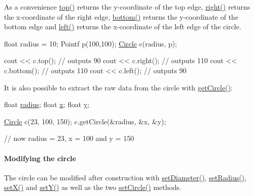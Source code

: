 As a convenience \hyperlink{classprism_1_1_circle_a2c1851a017d5379d8ddf2a80d7bd1b1b}{top()} returns the y-\/coordinate of the top edge, \hyperlink{classprism_1_1_circle_a3b8cdbb5ad090615534c09543afadf88}{right()} returns the x-\/coordinate of the right edge, \hyperlink{classprism_1_1_circle_a88c4958371f4e07082c3b28527b67d4b}{bottom()} returns the y-\/coordinate of the bottom edge and \hyperlink{classprism_1_1_circle_a8bcb92c5bf29227e2ef5ab0f15b479b2}{left()} returns the x-\/coordinate of the left edge of the circle.


\begin{DoxyCode}
\textcolor{keywordtype}{float} radius = 10;
Pointf p(100,100);
\hyperlink{classprism_1_1_circle_aff41793f64e90d15a4d89851b1a6b011}{Circle} c(radius, p);

cout << c.top(); \textcolor{comment}{// outputs 90}
cout << c.right(); \textcolor{comment}{// outputs 110}
cout << c.bottom(); \textcolor{comment}{// outputs 110}
cout << c.left(); \textcolor{comment}{// outputs 90}
\end{DoxyCode}


It is also possible to extract the raw data from the circle with \hyperlink{classprism_1_1_circle_a84de2ca47dc084e49cc6645e7e723b9d}{get\+Circle()}\+:


\begin{DoxyCode}
\textcolor{keywordtype}{float} \hyperlink{classprism_1_1_circle_a75afa2c59f92909d6b6edcec338030fb}{radius};
\textcolor{keywordtype}{float} \hyperlink{classprism_1_1_circle_ae1f729f8fa34605123628e67b230b6be}{x};
\textcolor{keywordtype}{float} \hyperlink{classprism_1_1_circle_a6edc045d912b0d278bd0673af028290e}{y};

\hyperlink{classprism_1_1_circle_aff41793f64e90d15a4d89851b1a6b011}{Circle} c(23, 100, 150);
c.getCircle(&radius, &x, &y);

\textcolor{comment}{// now radius = 23, x = 100 and y = 150}
\end{DoxyCode}


\paragraph*{Modifying the circle}

The circle can be modified after construction with \hyperlink{classprism_1_1_circle_a170c17969d402d01ace2b756c2eec16b}{set\+Diameter()}, \hyperlink{classprism_1_1_circle_ad32152033f280f8c32aebf6791c59fcd}{set\+Radius()}, \hyperlink{classprism_1_1_circle_a9f584b9f7d780975557d6293b18cc051}{set\+X()} and \hyperlink{classprism_1_1_circle_add9bf882d06da81faa8063c9a3fec8ae}{set\+Y()} as well as the two \hyperlink{classprism_1_1_circle_a4d04a2dd0e3a9df5ff6a93e5f67ebcb8}{set\+Circle()} methods.

